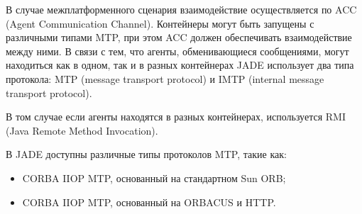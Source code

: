 В случае межплатформенного сценария взаимодействие осуществляется по ACC (Agent Communication Channel). Контейнеры могут быть запущены с различными типами MTP, при этом ACC должен обеспечивать взаимодействие между ними.
В связи с тем, что агенты, обменивающиеся сообщениями, могут находиться как в одном, так и в разных контейнерах JADE использует два типа протокола: MTP (message transport protocol) и IMTP (internal message transport protocol).

В том случае если агенты находятся в разных контейнерах, используется RMI (Java Remote Method Invocation).

В JADE доступны различные типы протоколов MTP, такие как:
\begin{itemize}
\item CORBA IIOP MTP, основанный на стандартном Sun ORB;
\item CORBA IIOP MTP, основанный на ORBACUS и HTTP.
\end{itemize}
